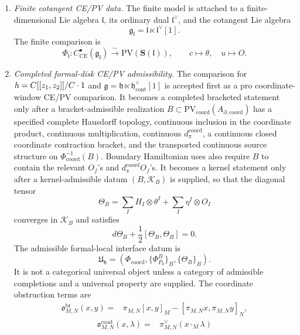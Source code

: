 \begin{enumerate}
  \item \emph{Finite cotangent CE/PV data.}
  The finite model is attached to a finite-dimensional Lie algebra
  \(\mathfrak l\), its ordinary dual \(\mathfrak l^\vee\), and the
  cotangent Lie algebra
  \[
    \mathfrak g_{\mathfrak l}
    =\mathfrak l\ltimes \mathfrak l^\vee[1].
  \]
  The finite comparison is
  \[
    \Phi_{\mathfrak l}\colon
    C^\bullet_{\mathrm{CE}}(\mathfrak g_{\mathfrak l})
    \xrightarrow{\sim}
    \mathrm{PV}(\mathbf S(\mathfrak l)),
    \qquad c\mapsto\theta,\quad u\mapsto O .
  \]

  \item \emph{Completed formal-disk CE/PV admissibility.}
  The comparison for
  \(h=C[[z_1,z_2]]/C\cdot1\) and
  \(\mathfrak g=\mathfrak h\ltimes
  \mathfrak h^\vee_{\mathrm{cont}}[1]\) is accepted first as a pro
  coordinate-window CE/PV comparison.  It becomes a completed bracketed
  statement only after a bracket-admissible realization \(B\subset
  \mathrm{PV}_{\mathrm{coord}}(A_{\partial,\mathrm{coord}})\) has a
  specified complete Hausdorff topology, continuous inclusion in the
  coordinate product, continuous multiplication, continuous
  \(d_\pi^{\mathrm{coord}}\), a continuous closed coordinate contraction
  bracket, and the transported continuous source structure on
  \(\Phi_{\mathrm{coord}}^{-1}(B)\).  Boundary Hamiltonian uses also
  require \(B\) to contain the relevant \(O_f\)'s and
  \(d_\pi^{\mathrm{coord}}O_f\)'s.  It becomes a kernel statement only
  after a kernel-admissible datum \((B,\mathcal K_B)\) is supplied, so that
  the diagonal tensor
  \[
    \Theta_B=\sum_I H_I\otimes\theta^I+\sum_I\eta^I\otimes O_I
  \]
  converges in \(\mathcal K_B\) and satisfies
  \[
    d\Theta_B+\frac12[\Theta_B,\Theta_B]=0.
  \]
  The admissible formal-local interface datum is
  \[
    \mathfrak U_{\mathfrak h}
    =(\Phi_{\mathrm{coord}},\{\Phi^B_{P_0}\}_B,\{\Theta_B\}_B).
  \]
  It is not a categorical universal object unless a category of
  admissible completions and a universal property are supplied.
  The
  coordinate obstruction terms are
  \[
    \begin{aligned}
    \mathfrak o^{\mathrm{br}}_{M,N}(x,y)
      ={}&\pi_{M,N}[x,y]_M-[\pi_{M,N}x,\pi_{M,N}y]_N,
    \end{aligned}
  \]
  \[
    \begin{aligned}
    \mathfrak o^{\mathrm{coad}}_{M,N}(x,\lambda)
      ={}&\pi^\vee_{M,N}(x\cdot_M\lambda)\\

\end{aligned}\]
\end{enumerate}
